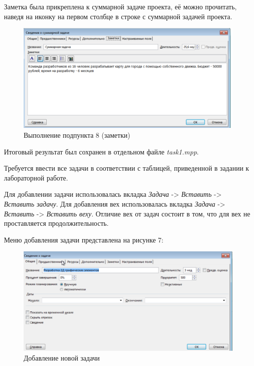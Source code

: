 Заметка была прикреплена к суммарной задаче проекта, её можно прочитать, наведя на иконку на первом столбце в строке с суммарной задачей проекта.
\FloatBarrier
\begin{figure}[h]	
	\begin{center}
		\includegraphics[width=\linewidth]{inc/1-82.png}
	\end{center}
	\captionsetup{justification=centering}
	\caption{Выполнение подпункта 8 (заметки)}
\end{figure}
\FloatBarrier

Итоговый результат был сохранен в отдельном файле \textit{task1.mpp}.

Требуется ввести все задачи в соответствии с таблицей, приведенной в задании к лабораторной работе.

Для добавлении задачи использовалась вкладка \textit{Задача} -> \textit{Вставить} -> \textit{Вставить задачу}.
Для добавления вех использовалась вкладка \textit{Задача} -> \textit{Вставить} -> \textit{Вставить веху}.
Отличие вех от задач состоит в том, что для вех не проставляется продолжительность.

Меню добавления задачи представлена на рисунке 7:
\FloatBarrier
\begin{figure}[h]	
	\begin{center}
		\includegraphics[width=\linewidth]{inc/2-1.png}
	\end{center}
	\captionsetup{justification=centering}
	\caption{Добавление новой задачи}
\end{figure}
\FloatBarrier

